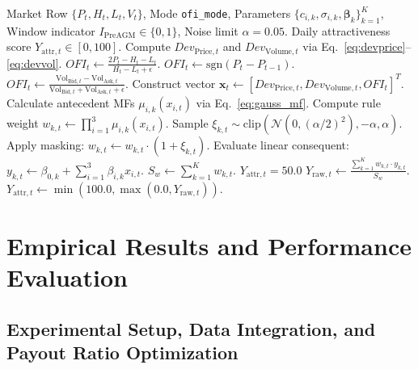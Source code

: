 \documentclass[pdflatex,sn-mathphys-num]{sn-jnl}
\theoremstyle{thmstyleone}
\theoremstyle{thmstyletwo}
\theoremstyle{thmstylethree}
\begin{document}
\begin{algorithm}[htbp]
\caption{TSK Inference with OFI Proxy Mode and Anti-Frontrunning Masking}\label{alg:tsk_eval}
\begin{algorithmic}[1]
\Require Market Row $\{P_t, H_t, L_t, V_t\}$, Mode \texttt{ofi\_mode}, Parameters $\{c_{i,k}, \sigma_{i,k}, \boldsymbol{\beta}_k\}_{k=1}^K$, Window indicator $I_{\mathrm{PreAGM}} \in \{0, 1\}$, Noise limit $\alpha = 0.05$.
\Ensure Daily attractiveness score $Y_{\mathrm{attr},t} \in [0, 100]$.
\State Compute $Dev_{\mathrm{Price},t}$ and $Dev_{\mathrm{Volume},t}$ via Eq.~\eqref{eq:devprice}--\eqref{eq:devvol}.
    \State $OFI_t \leftarrow \frac{2 P_t - H_t - L_t}{H_t - L_t + \epsilon}$.
    \State $OFI_t \leftarrow \mathrm{sgn}(P_t - P_{t-1})$.
\Else {}
    \State $OFI_t \leftarrow \frac{\mathrm{Vol}_{\mathrm{Bid},t} - \mathrm{Vol}_{\mathrm{Ask},t}}{\mathrm{Vol}_{\mathrm{Bid},t} + \mathrm{Vol}_{\mathrm{Ask},t} + \epsilon}$.
\EndIf
\State Construct vector $\mathbf{x}_t \leftarrow [Dev_{\mathrm{Price},t}, Dev_{\mathrm{Volume},t}, OFI_t]^T$.
    \State Calculate antecedent MFs $\mu_{i,k}(x_{i,t})$ via Eq.~\eqref{eq:gauss_mf}.
    \State Compute rule weight $w_{k,t} \leftarrow \prod_{i=1}^3 \mu_{i,k}(x_{i,t})$.
        \State Sample $\xi_{k,t} \sim \mathrm{clip}(\mathcal{N}(0, (\alpha/2)^2), -\alpha, \alpha)$.
        \State Apply masking: $w_{k,t} \leftarrow w_{k,t} \cdot (1 + \xi_{k,t})$.
    \EndIf
    \State Evaluate linear consequent: $y_{k,t} \leftarrow \beta_{0,k} + \sum_{i=1}^3 \beta_{i,k} x_{i,t}$.
\EndFor
\State $S_w \leftarrow \sum_{k=1}^K w_{k,t}$.
    \State \Return $Y_{\mathrm{attr},t} = 50.0$
\EndIf
\State $Y_{\mathrm{raw},t} \leftarrow \frac{\sum_{k=1}^K w_{k,t} \cdot y_{k,t}}{S_w}$.
\State \Return $Y_{\mathrm{attr},t} \leftarrow \min(100.0, \max(0.0, Y_{\mathrm{raw},t}))$.
\end{algorithmic}
\end{algorithm}

\section{Empirical Results and Performance Evaluation}

\subsection{Experimental Setup, Data Integration, and Payout Ratio Optimization}
\end{document}
